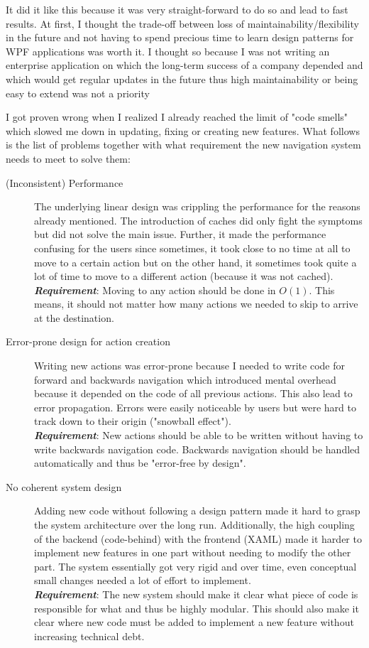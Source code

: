 \par

It did it like this because it was very straight-forward to do so and lead to fast results. At first, I thought the trade-off between loss of maintainability/flexibility in the future and not having to spend precious time to learn design patterns for WPF applications was worth it. I thought so because I was not writing an enterprise application on which the long-term success of a company depended and which would get regular updates in the future thus high maintainability or being easy to extend was not a priority

\par

I got proven wrong when I realized I already reached the limit of "code smells" which slowed me down in updating, fixing or creating new features. What follows is the list of problems together with what requirement the new navigation system needs to meet to solve them:

\begin{description}
\item [(Inconsistent) Performance] The underlying linear design was crippling the performance for the reasons already mentioned. The introduction of caches did only fight the symptoms but did not solve the main issue. Further, it made the performance confusing for the users since sometimes, it took close to no time at all to move to a certain action but on the other hand, it sometimes took quite a lot of time to move to a different action (because it was not cached). \\
\textit{\textbf{Requirement}}: Moving to any action should be done in $O(1)$. This means, it should not matter how many actions we needed to skip to arrive at the destination.
\item [Error-prone design for action creation] Writing new actions was error-prone because I needed to write code for forward and backwards navigation which introduced mental overhead because it depended on the code of all previous actions. This also lead to error propagation. Errors were easily noticeable by users but were hard to track down to their origin ("snowball effect").\\
\textit{\textbf{Requirement}}: New actions should be able to be written without having to write backwards navigation code. Backwards navigation should be handled automatically and thus be "error-free by design".
\item [No coherent system design] Adding new code without following a design pattern made it hard to grasp the system architecture over the long run. Additionally, the high coupling of the backend (code-behind) with the frontend (XAML) made it harder to implement new features in one part without needing to modify the other part. The system essentially got very rigid and over time, even conceptual small changes needed a lot of effort to implement.\\
\textit{\textbf{Requirement}}: The new system should make it clear what piece of code is responsible for what and thus be highly modular. This should also make it clear where new code must be added to implement a new feature without increasing technical debt.
\end{description}
